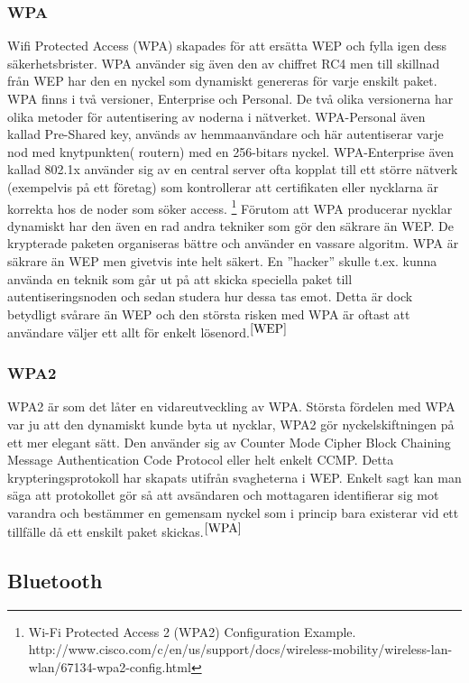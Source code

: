 \documentclass[a4paper,12pt,fleqn]{article}
\begin{document}
\subsubsection{WPA}
Wifi Protected Access (WPA) skapades för att ersätta WEP och fylla igen dess säkerhetsbrister. WPA använder sig även den av chiffret RC4 men till skillnad från WEP har den en nyckel som dynamiskt genereras för varje enskilt paket. WPA finns i två versioner, Enterprise och Personal. De två olika versionerna har olika metoder för autentisering av noderna i nätverket. WPA-Personal även kallad Pre-Shared key, används av hemmaanvändare och här autentiserar varje nod med knytpunkten( routern) med en 256-bitars nyckel. WPA-Enterprise även kallad 802.1x använder sig av en central server ofta kopplat till ett större nätverk (exempelvis på ett företag) som kontrollerar att certifikaten eller nycklarna är korrekta hos de noder som söker access. \footnote{\label{WPA}Wi-Fi Protected Access 2 (WPA2) Configuration Example. http://www.cisco.com/c/en/us/support/docs/wireless-mobility/wireless-lan-wlan/67134-wpa2-config.html}
Förutom att WPA producerar nycklar dynamiskt har den även en rad andra tekniker som gör den säkrare än WEP. De krypterade paketen organiseras bättre och använder en vassare algoritm. WPA är säkrare än WEP men givetvis inte helt säkert. En ''hacker'' skulle t.ex. kunna använda en teknik som går ut på att skicka speciella paket till autentiseringsnoden och sedan studera hur dessa tas emot. Detta är dock betydligt svårare än WEP och den största risken med WPA är oftast att användare väljer ett allt för enkelt lösenord.$^{\ref{WEP}}$

\subsubsection{WPA2}
WPA2 är som det låter en vidareutveckling av WPA. Största fördelen med WPA var ju att den dynamiskt kunde byta ut nycklar, WPA2 gör nyckelskiftningen på ett mer elegant sätt. Den använder sig av Counter Mode Cipher Block Chaining Message Authentication Code Protocol eller helt enkelt CCMP. Detta krypteringsprotokoll har skapats utifrån svagheterna i WEP. Enkelt sagt kan man säga att protokollet gör så att avsändaren och mottagaren identifierar sig mot varandra och bestämmer en gemensam nyckel som i princip bara existerar vid ett tillfälle då ett enskilt paket skickas.$^{\ref{WPA}}$
\newpage

\subsection{Bluetooth}
\end{document}
